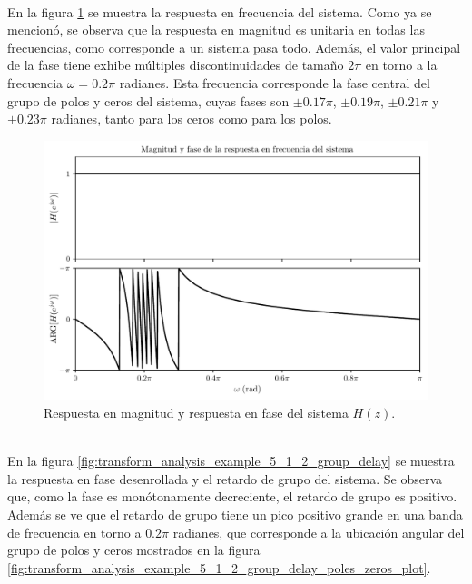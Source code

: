 \documentclass[a4paper]{report}
\begin{document}
\\
En la figura \ref{fig:transform_analysis_example_5_1_2_group_delay_frequency_response} se muestra la respuesta en frecuencia del sistema. Como ya se mencionó, se observa que la respuesta en magnitud es unitaria en todas las frecuencias, como corresponde a un sistema pasa todo. Además, el valor principal de la fase tiene exhibe múltiples discontinuidades de tamaño \(2\pi\) en torno a la frecuencia \(\omega=0.2\pi\) radianes. Esta frecuencia corresponde la fase central del grupo de polos y ceros del sistema, cuyas fases son \(\pm0.17\pi\), \(\pm0.19\pi\), \(\pm0.21\pi\) y \(\pm0.23\pi\) radianes, tanto para los ceros como para los polos.
\begin{figure}[!htb]
 \begin{center}
 \includegraphics[width=\textwidth]{figuras/transform_analysis_example_5_1_2_group_delay_frequency_response.pdf}
 \caption{\label{fig:transform_analysis_example_5_1_2_group_delay_frequency_response} Respuesta en magnitud y respuesta en fase del sistema \(H(z)\).}
 \end{center}
\end{figure} 
\\
En la figura \ref{fig:transform_analysis_example_5_1_2_group_delay} se muestra la respuesta en fase desenrollada y el retardo de grupo del sistema. Se observa que, como la fase es monótonamente decreciente, el retardo de grupo es positivo. Además se ve que el retardo de grupo tiene un pico positivo grande en una banda de frecuencia en torno a \(0.2\pi\) radianes,  que corresponde a la ubicación angular del grupo de polos y ceros mostrados en la figura \ref{fig:transform_analysis_example_5_1_2_group_delay_poles_zeros_plot}.
\end{document}

